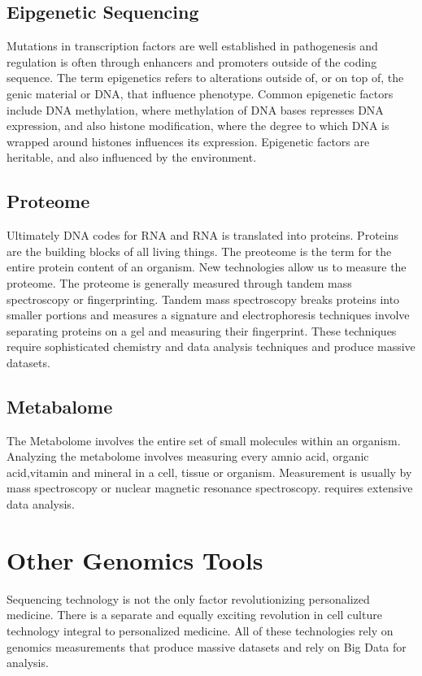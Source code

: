 \documentclass[sigconf]{acmart}
\begin{document}
\subsection{Eipgenetic Sequencing}
Mutations in transcription factors are well established in pathogenesis and regulation is often through enhancers and promoters outside of the coding sequence. The term epigenetics refers to alterations outside of, or on top of, the genic material or DNA, that influence phenotype. Common epigenetic factors include DNA methylation, where methylation of DNA bases represses DNA expression, and also histone modification, where the degree to which DNA is wrapped around histones influences its expression.   Epigenetic factors are heritable, and also influenced by the environment. \cite{holliday2006epigenetics}   

\subsection{Proteome}
Ultimately DNA codes for RNA and RNA is translated into proteins.  Proteins are the building blocks of all living things.  The preoteome is the term for the entire protein content of an organism.  New technologies allow us to measure the proteome.  The proteome is generally measured through tandem mass spectroscopy or fingerprinting.  Tandem mass spectroscopy breaks proteins into smaller portions and measures a signature and electrophoresis techniques involve separating proteins on a gel and measuring their fingerprint.  These techniques require sophisticated chemistry and data analysis techniques and produce massive datasets. \cite{gorg2004current}

\subsection{Metabalome}
The Metabolome involves the entire set of small molecules within an organism.  Analyzing the metabolome involves measuring every amnio acid, organic acid,vitamin and mineral in a cell, tissue or organism.  Measurement is usually by mass spectroscopy or nuclear magnetic resonance spectroscopy.    requires extensive data analysis.    

\section{Other Genomics Tools}
Sequencing technology is not the only factor revolutionizing personalized medicine.  There is a separate and equally exciting revolution in cell culture technology integral to personalized medicine.  All of these technologies rely on genomics measurements that produce massive datasets and rely on Big Data for analysis.   
\end{document}
